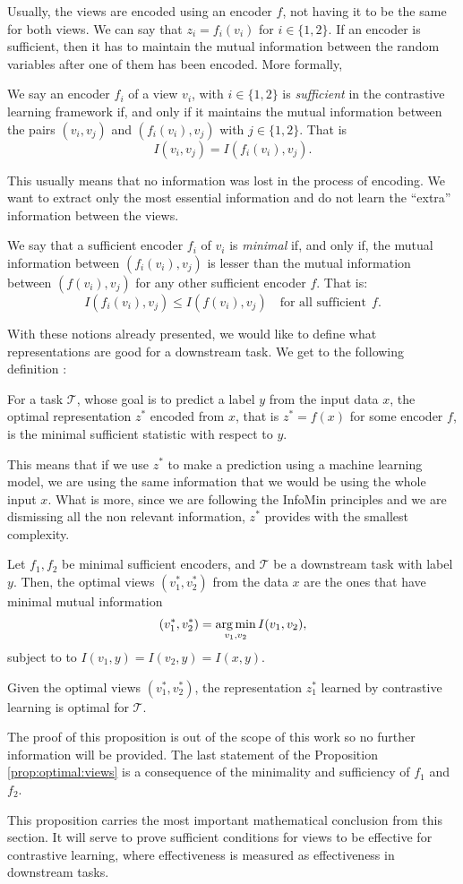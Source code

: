 Usually, the views are encoded using an encoder $f$, not having it to be the same for both views. We can say that $z_i = f_i(v_i)$ for $i \in \{1,2\}$. If an encoder is sufficient, then it has to maintain the mutual information between the random variables after one of them has been encoded. More formally,

\begin{ndef}
We say an encoder $f_i$ of a view $v_i$, with $i \in \{1,2\}$ is \emph{sufficient} in the contrastive learning framework if, and only if it maintains the mutual information between the pairs $(v_i,v_j)$ and $(f_i(v_i),v_j)$ with $j \in \{1,2\}$. That is
\[
I(v_i,v_j) = I(f_i(v_i),v_j).    
\]
\end{ndef}
This usually means that no information was lost in the process of encoding. We want to extract only the most essential information and do not learn the ``extra'' information between the views.
\begin{ndef}
We say that a sufficient encoder $f_i$ of $v_i$ is \emph{minimal} if, and only if, the mutual information between $(f_i(v_i),v_j)$ is lesser than the mutual information between $(f(v_i),v_j)$ for any other sufficient encoder $f$. That is:
\[
I(f_i(v_i),v_j) \leq I(f(v_i),v_j) \quad \text{for all sufficient}\ \ f. 
\]
\end{ndef}

With these notions already presented, we would like to define what representations are good for a downstream task. We get to the following definition \citep{tian_what_2020}:
\begin{ndef}
For a task $\mathcal T$, whose goal is to predict a label $y$ from the input data $x$, the optimal representation $z^*$ encoded from $x$, that is $z^* = f(x)$ for some encoder $f$, is the minimal sufficient statistic with respect to $y$.
\end{ndef}
This means that if we use $z^*$ to make a prediction using a machine learning model, we are using the same information that we would be using the whole input $x$. What is more, since we are following the InfoMin principles and we are dismissing all the non relevant information, $z^*$ provides with the smallest complexity.

\begin{nprop}\label{prop:optimal:views}
Let $f_1,f_2$ be minimal sufficient encoders, and $\mathcal T$ be a downstream task with label $y$. Then, the optimal views $(v_1^*,v_2^*)$ from the data $x$ are the ones that have minimal mutual information
\[
    (v_1^*,v_2^*) = \operatorname*{arg\,min}_{v_1,v_2} I(v_1,v_2),
\]
subject to to $I(v_1,y) = I(v_2,y) = I(x,y)$.

Given the optimal views $(v_1^*,v_2^*)$, the representation $z_1^*$ learned by contrastive learning is optimal for $\mathcal T$.
\end{nprop}
The proof of this proposition is out of the scope of this work so no further information will be provided. The last statement of the Proposition \ref{prop:optimal:views} is a consequence of the minimality and sufficiency of $f_1$ and $f_2$. 

This proposition carries the most important mathematical conclusion from this section. It will serve to prove sufficient conditions for views to be effective for contrastive learning, where effectiveness is measured as effectiveness in downstream tasks.


